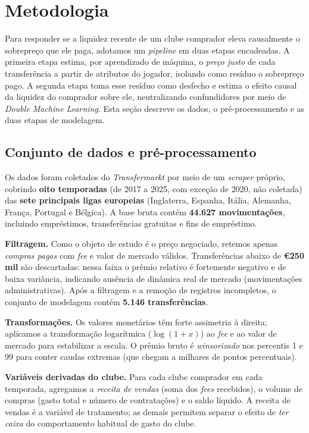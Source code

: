 \section{Metodologia}

Para responder se a liquidez recente de um clube comprador eleva causalmente o sobrepreço que ele
paga, adotamos um \textit{pipeline} em duas etapas encadeadas. A primeira etapa estima, por
aprendizado de máquina, o \textit{preço justo} de cada transferência a partir de atributos do
jogador, isolando como resíduo o sobrepreço pago. A segunda etapa toma esse resíduo como desfecho e
estima o efeito causal da liquidez do comprador sobre ele, neutralizando confundidores por meio de
\textit{Double Machine Learning}. Esta seção descreve os dados, o pré-processamento e as duas
etapas de modelagem.

\subsection{Conjunto de dados e pré-processamento}

Os dados foram coletados do \textit{Transfermarkt} por meio de um \textit{scraper} próprio, cobrindo
\textbf{oito temporadas} (de 2017 a 2025, com exceção de 2020, não coletada) das \textbf{sete
principais ligas europeias} (Inglaterra, Espanha, Itália, Alemanha, França, Portugal e Bélgica).
A base bruta contém \textbf{44.627 movimentações}, incluindo empréstimos, transferências gratuitas e
fins de empréstimo.

\textbf{Filtragem.} Como o objeto de estudo é o preço negociado, retemos apenas \textit{compras
pagas} com \textit{fee} e valor de mercado válidos. Transferências abaixo de \textbf{€250 mil} são
descartadas: nessa faixa o prêmio relativo é fortemente negativo e de baixa variância, indicando
ausência de dinâmica real de mercado (movimentações administrativas). Após a filtragem e a remoção
de registros incompletos, o conjunto de modelagem contém \textbf{5.146 transferências}.

\textbf{Transformações.} Os valores monetários têm forte assimetria à direita; aplicamos a
transformação logarítmica ($\log(1+x)$) ao \textit{fee} e ao valor de mercado para estabilizar a
escala. O prêmio bruto é \textit{winsorizado} nos percentis 1 e 99 para conter caudas extremas
(que chegam a milhares de pontos percentuais).

\textbf{Variáveis derivadas do clube.} Para cada clube comprador em cada temporada, agregamos a
\textit{receita de vendas} (soma dos \textit{fees} recebidos), o volume de compras (gasto total e
número de contratações) e o saldo líquido. A receita de vendas é a variável de tratamento; as
demais permitem separar o efeito de \textit{ter caixa} do comportamento habitual de gasto do clube.

